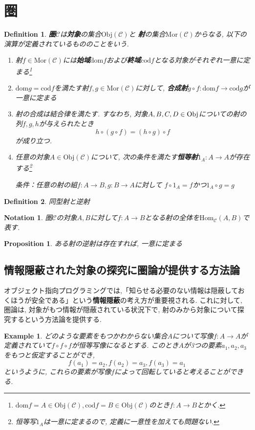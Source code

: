 \documentclass{jsbook}
\theoremstyle{plain}
\newtheorem{Def}{Definition}[chapter]
\newtheorem{Notation}{Notation}[chapter]
\newtheorem{Prop}{Proposition}[chapter]
\newtheorem{example}{Example}[chapter]
\begin{document}
\section{圏}
\begin{Def}
{\bf 圏}$\mathscr{C}$は{\bf 対象}の集合$\mathrm{Obj}(\mathscr{C})$と
{\bf 射}の集合$\mathrm{Mor}(\mathscr{C})$からなる, 以下の演算が定義されているもののことをいう.
\begin{enumerate}
\item 射$f\in\mathrm{Mor}(\mathscr{C})$には{\bf 始域}$\mathrm{dom}f$および{\bf 終域}$\mathrm{cod}f$となる対象がそれぞれ一意に定まる\footnote{$\mathrm{dom}f=A\in\mathrm{Obj}(\mathscr{C}),\mathrm{cod}f=B\in\mathrm{Obj}(\mathscr{C})$のとき$f:A\rightarrow B$とかく.}
\item $\mathrm{dom} g=\mathrm{cod}f$を満たす射$f,g\in\mathrm{Mor}(\mathscr{C})$に対して,
{\bf 合成射}$g\circ f:\mathrm{dom}f\rightarrow\mathrm{cod}g$が一意に定まる
\item 射の合成は結合律を満たす. すなわち, 対象$A,B,C,D\in\rm{Obj}$についての射の列$f,g,h$が与えられたとき
\[
h\circ(g\circ f)=(h\circ g)\circ f
\]
が成り立つ.
\item 任意の対象$A\in\mathrm{Obj}(\mathscr{C})$について,
次の条件を満たす{\bf 恒等射}$1_{A}:A\rightarrow A$が存在する\footnote{恒等写$1_{A}$は一意に定まるので, 定義に一意性を加えても問題ない.}

条件：任意の射の組$f:A\rightarrow B, g:B\rightarrow A$に対して
$f\circ 1_A=f$かつ$1_A\circ g=g$
\end{enumerate}
\end{Def}
\begin{Def}
同型射と逆射
\end{Def}
\begin{Notation}
圏$\mathscr{C}$の対象$A,B$に対して$f:A\rightarrow B$となる射の全体を$\mathrm{Hom}_{\mathscr{C}}(A,B)$で表す.
\end{Notation}
\begin{Prop}
ある射の逆射は存在すれば, 一意に定まる
\end{Prop}
\subsection{情報隠蔽された対象の探究に圏論が提供する方法論}
オブジェクト指向プログラミングでは,「知らせる必要のない情報は隠蔽しておくほうが安全である」という{\bf 情報隠蔽}の考え方が重要視される.
これに対して, 圏論は, 対象がもつ情報が隠蔽されている状況下で, 射のみから対象について探究するという方法論を提供する.
\begin{example}
どのような要素をもつかわからない集合$A$について写像$f:A\rightarrow A$が定義されていて$f\circ f\circ f$が恒等写像になるとする.
このとき$A$が3つの要素$a_1,a_2,a_3$をもつと仮定することができ,
\[
f(a_1)=a_2, f(a_2)=a_3, 
f(a_3)=a_1
\]
というように, これらの要素が写像$f$によって回転していると考えることができる.
\end{example}
\end{document}
